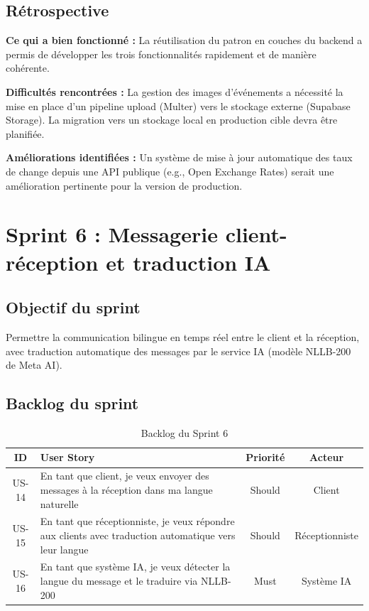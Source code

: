 \subsection{Rétrospective}

\textbf{Ce qui a bien fonctionné :} La réutilisation du patron en couches du backend a permis de développer les trois fonctionnalités rapidement et de manière cohérente.

\textbf{Difficultés rencontrées :} La gestion des images d'événements a nécessité la mise en place d'un pipeline upload (Multer) vers le stockage externe (Supabase Storage). La migration vers un stockage local en production cible devra être planifiée.

\textbf{Améliorations identifiées :} Un système de mise à jour automatique des taux de change depuis une API publique (e.g., Open Exchange Rates) serait une amélioration pertinente pour la version de production.

\section{Sprint 6 : Messagerie client-réception et traduction IA}
\label{sec:sprint6}

\subsection{Objectif du sprint}

Permettre la communication bilingue en temps réel entre le client et la réception, avec traduction automatique des messages par le service IA (modèle NLLB-200 de Meta AI).

\subsection{Backlog du sprint}

\begin{table}[H]
\centering
\caption{Backlog du Sprint 6}
\label{tab:backlog_sprint6}
\begin{tabular}{|c|p{9cm}|c|c|}
\hline
\textbf{ID} & \textbf{User Story} & \textbf{Priorité} & \textbf{Acteur} \\
\hline
US-14 & En tant que client, je veux envoyer des messages à la réception dans ma langue naturelle & Should & Client \\
\hline
US-15 & En tant que réceptionniste, je veux répondre aux clients avec traduction automatique vers leur langue & Should & Réceptionniste \\
\hline
US-16 & En tant que système IA, je veux détecter la langue du message et le traduire via NLLB-200 & Must & Système IA \\
\hline
\end{tabular}
\end{table}

